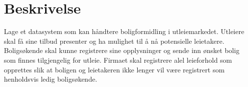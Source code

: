 \section{Beskrivelse}
Lage et datasystem som kan håndtere boligformidling i utleiemarkedet. Utleiere skal få sine tilbud presenter og ha mulighet til å nå potensielle leietakere. Boligsøkende skal kunne registrere sine opplysninger og sende inn ønsket bolig som finnes tilgjengelig for utleie. Firmaet skal registrere alel leieforhold som opprettes slik at boligen og leietakeren ikke lenger vil være registrert som henholdsvis ledig boligsøkende. 
